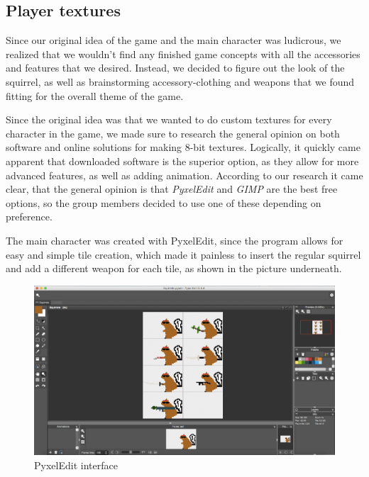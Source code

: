 \documentclass[12p]{article}
\begin{document}
\subsection{Player textures} \label{DocVisualPlayerTextures}

Since our original idea of the game and the main character was ludicrous, we realized that we wouldn’t find any finished game concepts with all the accessories and features that we desired. Instead, we decided to figure out the look of the squirrel, as well as brainstorming accessory-clothing and weapons that we found fitting for the overall theme of the game.

Since the original idea was that we wanted to do custom textures for every character in the game, we made sure to research the general opinion on both software and online solutions for making 8-bit textures. Logically, it quickly came apparent that downloaded software is the superior option, as they allow for more advanced features, as well as adding animation. According to our research it came clear, that the general opinion is that \emph{PyxelEdit} \cite{PyxelEdit} and \emph{GIMP} \cite{GIMP} are the best free options, so the group members decided to use one of these depending on preference.

The main character was created with PyxelEdit, since the program allows for easy and simple tile creation, which made it painless to insert the regular squirrel and add a different weapon for each tile, as shown in the picture underneath.

\begin{figure}[ht]
  \center
  \includegraphics[width=1\textwidth]{Documentation/Picture1.png}
  \caption{PyxelEdit interface \cite{PyxelEdit}}
  \label{fig:pyxeledit_screenshot}
\end{figure}
\end{document}
